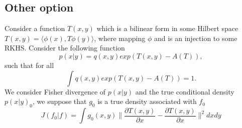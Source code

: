 \documentclass[10pt]{article}
\begin{document}
\subsection{Other option}
\label{sec:option2}
Consider a function $T(x,y)$ which is a bilinear form in some Hilbert space  $T(x,y) = \langle \phi(x), T \phi(y) \rangle $, where mapping $\phi$ and is an injection to some RKHS. Consider the following function
\begin{equation}
p(x|y) = q(x,y)exp(T(x,y) - A(T)),
\end{equation}
such that for all 
\begin{equation}
\label{eq:toOne}
 \int q(x,y)exp(T(x,y) - A(T)) = 1. 
\end{equation}
We consider Fisher divergence of $p(x|y)$ and the true conditional density $p(x|y)_0$, we suppose that $g_0$ is a true density associated with $f_0$ 
\begin{equation}
J(f_0|f) = \int g_0(x,y) \parallel \frac{\partial T(x,y)} {\partial x} -\frac{\partial T(x,y)} {\partial x} \parallel^2 dx dy  
\end{equation}
\end{document}
